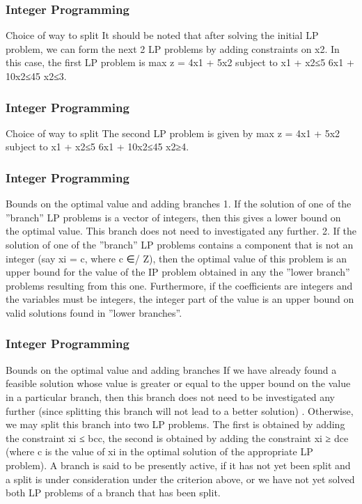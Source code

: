 \begin{frame} 
\frametitle{Integer Programming}     
Choice of way to split
It should be noted that after solving the initial LP problem, we can
form the next 2 LP problems by adding constraints on x2. In this
case, the first LP problem is
max z = 4x1 + 5x2
subject to
x1 + x2≤5
6x1 + 10x2≤45
x2≤3.
\end{frame} 
\begin{frame} 
\frametitle{Integer Programming}     
Choice of way to split
The second LP problem is given by
max z = 4x1 + 5x2
subject to
x1 + x2≤5
6x1 + 10x2≤45
x2≥4.
\end{frame}  
\begin{frame} 
\frametitle{Integer Programming}     
Bounds on the optimal value and adding branches
1. If the solution of one of the ”branch” LP problems is
a vector of integers, then this gives a lower bound on
the optimal value. This branch does not need to
investigated any further.
2. If the solution of one of the ”branch” LP problems
contains a component that is not an integer (say
xi = c, where c ∈/ Z), then the optimal value of this
problem is an upper bound for the value of the IP
problem obtained in any the ”lower branch” problems
resulting from this one. Furthermore, if the
coefficients are integers and the variables must be
integers, the integer part of the value is an upper
bound on valid solutions found in ”lower branches”.
\end{frame}  
\begin{frame} 
\frametitle{Integer Programming}     
Bounds on the optimal value and adding branches
If we have already found a feasible solution whose value is greater
or equal to the upper bound on the value in a particular branch,
then this branch does not need to be investigated any further
(since splitting this branch will not lead to a better solution) .
Otherwise, we may split this branch into two LP problems. The
first is obtained by adding the constraint xi ≤ bcc, the second is
obtained by adding the constraint xi ≥ dce (where c is the value of
xi
in the optimal solution of the appropriate LP problem).
A branch is said to be presently active, if it has not yet been split
and a split is under consideration under the criterion above, or we
have not yet solved both LP problems of a branch that has been
split.
\end{frame}  
